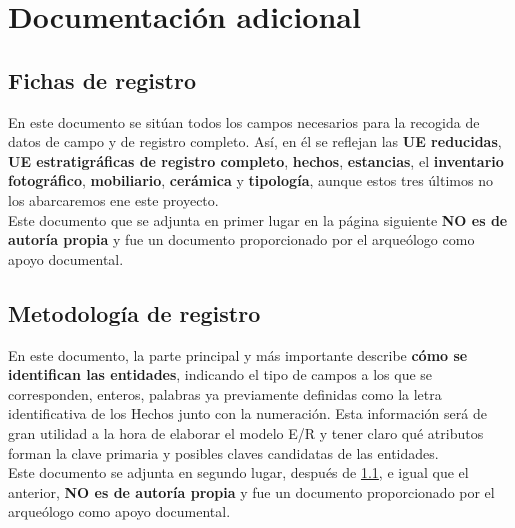 \chapter{Documentación adicional}
\section{Fichas de registro} \label{sec:registrationforms}
En este documento se sitúan todos los campos necesarios para la recogida de datos de campo
y de registro completo. Así, en él se reflejan las \textbf{UE reducidas}, \textbf{UE
estratigráficas de registro completo},  \textbf{hechos}, \textbf{estancias}, el
\textbf{inventario fotográfico}, \textbf{mobiliario}, \textbf{cerámica} y \textbf{tipología},
aunque estos tres últimos no los abarcaremos ene este proyecto. \\

Este documento que se adjunta en primer lugar en la página siguiente \textbf{NO es de
autoría propia} y fue un documento proporcionado por el arqueólogo como apoyo documental.

\section{Metodología de registro}
En este documento, la parte principal y más importante describe \textbf{cómo se identifican
las entidades}, indicando el tipo de campos a los que se corresponden, enteros, palabras ya
previamente definidas como la letra identificativa de los Hechos junto con la numeración. Esta
información será de gran utilidad a la hora de elaborar el modelo E/R y tener claro qué
atributos forman la clave primaria y posibles claves candidatas de las entidades. \\

Este documento se adjunta en segundo lugar, después de \ref{sec:registrationforms}, e
igual que el anterior, \textbf{NO es de autoría propia} y fue un documento proporcionado por
el arqueólogo como apoyo documental.




